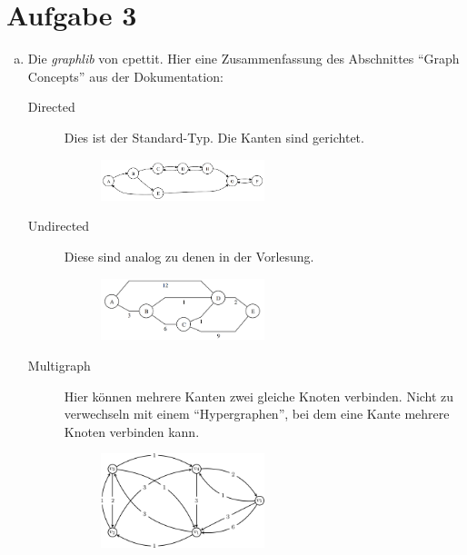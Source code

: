 \documentclass[11pt]{article}
\begin{document}
\newpage
  
\section*{Aufgabe 3}
\begin{enumerate}[a)]

  \item Die \emph{graphlib} von cpettit. Hier eine Zusammenfassung des
    Abschnittes ``Graph Concepts'' aus der Dokumentation:
    \begin{description}
      \item[Directed] 
        Dies ist der Standard-Typ. Die Kanten sind gerichtet.

        \begin{figure}[h!]
          \centering
          \includegraphics[width=0.5\textwidth]{./tarjan.png}
          \label{fig:}
        \end{figure}

      \item[Undirected]
        Diese sind analog zu denen in der Vorlesung.

        \begin{figure}[h!]
          \centering
          \includegraphics[width=0.5\textwidth]{prim-input.png}
          \label{fig:input}
        \end{figure}

      \item[Multigraph]
        Hier k\"onnen mehrere Kanten zwei gleiche Knoten verbinden. Nicht
        zu verwechseln mit einem ``Hypergraphen'', bei dem eine Kante mehrere
        Knoten verbinden kann.

        \begin{figure}[h!]
          \centering
          \includegraphics[width=0.5\textwidth]{weighted-multigraph.png}
          \label{fig:multigraph}
        \end{figure}


\end{description}
\end{enumerate}
\end{document}
